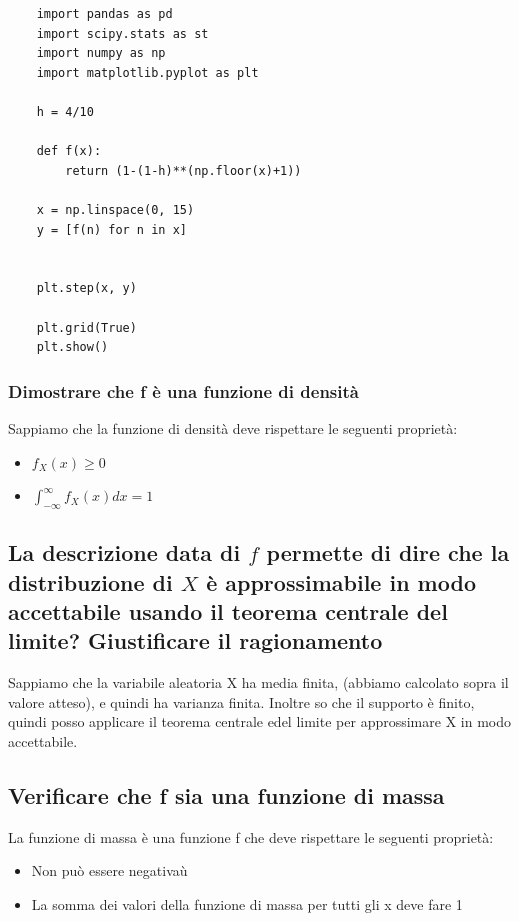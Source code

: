 \documentclass{article}
\begin{document}
\begin{lstlisting}
    import pandas as pd
    import scipy.stats as st
    import numpy as np
    import matplotlib.pyplot as plt

    h = 4/10

    def f(x):
        return (1-(1-h)**(np.floor(x)+1))

    x = np.linspace(0, 15)
    y = [f(n) for n in x]


    plt.step(x, y)

    plt.grid(True)
    plt.show()
\end{lstlisting}

\subsubsection*{Dimostrare che f è una funzione di densità}


Sappiamo che la funzione di densità deve rispettare le seguenti proprietà:

\begin{itemize}
    \item $f_X(x) \geq 0$
    \item $\int_{-\infty}^{\infty}f_X(x) dx = 1$

\end{itemize}

\subsection*{La descrizione data di $f$ permette di dire che la distribuzione di $X$ è approssimabile in modo accettabile usando il teorema centrale del limite? Giustificare il ragionamento}

Sappiamo che la variabile aleatoria X ha media finita, (abbiamo calcolato sopra il valore atteso), e quindi ha varianza finita. Inoltre so che il supporto è finito, quindi posso applicare il teorema centrale edel limite per approssimare X in modo accettabile.

\subsection*{Verificare che f sia una funzione di massa}

La funzione di massa è una funzione f che deve rispettare le seguenti proprietà:

\begin{itemize}
    \item Non può essere negativaù
    \item La somma dei valori della funzione di massa per tutti gli x deve fare 1
\end{itemize}
\end{document}
